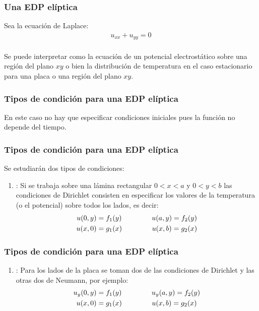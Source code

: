\documentclass[12pt]{beamer}
\begin{document}
\begin{frame}
\frametitle{Una EDP elíptica}
Sea la ecuación de Laplace:
\pause
\begin{align*}
u_{xx} + u_{yy} = 0
\end{align*}
\\
\bigskip
\pause
Se puede interpretar como la ecuación de un potencial electrostático sobre una región del plano $xy$ o bien la distribución de temperatura en el caso estacionario para una placa o una región del plano $xy$.
\end{frame}
\begin{frame}
\frametitle{Tipos de condición para una EDP elíptica}
En este caso no hay que especificar condiciones iniciales pues la función no depende del tiempo.
\end{frame}
\begin{frame}
\frametitle{Tipos de condición para una EDP elíptica}
Se estudiarán dos tipos de condiciones:
\begin{enumerate}[<+->]
\item {}: Si se trabaja sobre una lámina rectangular $0 < x < a$ y $0 < y < b$ las condiciones de Dirichlet consisten en especificar los valores de la temperatura (o el potencial) sobre todos los lados, es decir:
\begin{align}
\begin{aligned}
u (0, y) &= f_{1} (y) \hspace{1.5cm} u (a, y) = f_{2} (y) \\
u (x, 0) &= g_{1} (x) \hspace{1.5cm} u (x, b) = g_{2} (x)
\end{aligned}
\label{eq:ecuacion_06_02_05}
\end{align}
\seti
\end{enumerate}
\end{frame}
\begin{frame}
\frametitle{Tipos de condición para una EDP elíptica}
\begin{enumerate}[<+->]
\conti
\item {}: Para los lados de la placa se toman dos de las condiciones de Dirichlet y las otras dos de Neumann, por ejemplo:
\begin{align}
\begin{aligned}
u_{y} (0, y) &= f_{1} (y) \hspace{1.5cm} u_{y} (a, y) = f_{2} (y) \\
u (x, 0) &= g_{1} (x) \hspace{1.5cm} u (x, b) = g_{2} (x)
\end{aligned}
\label{eq:ecuacion_06_01_06}
\end{align}
\end{enumerate}
\end{frame}
\end{document}
